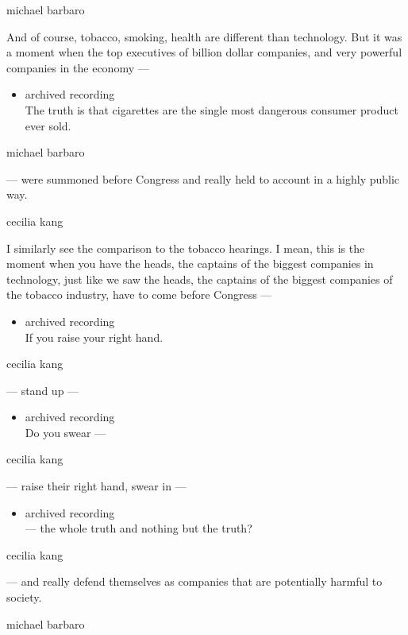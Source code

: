michael barbaro

And of course, tobacco, smoking, health are different than technology.
But it was a moment when the top executives of billion dollar companies,
and very powerful companies in the economy ---

\begin{itemize}
\tightlist
\item
  archived recording\\
  The truth is that cigarettes are the single most dangerous consumer
  product ever sold.
\end{itemize}

michael barbaro

--- were summoned before Congress and really held to account in a highly
public way.

cecilia kang

I similarly see the comparison to the tobacco hearings. I mean, this is
the moment when you have the heads, the captains of the biggest
companies in technology, just like we saw the heads, the captains of the
biggest companies of the tobacco industry, have to come before Congress
---

\begin{itemize}
\tightlist
\item
  archived recording\\
  If you raise your right hand.
\end{itemize}

cecilia kang

--- stand up ---

\begin{itemize}
\tightlist
\item
  archived recording\\
  Do you swear ---
\end{itemize}

cecilia kang

--- raise their right hand, swear in ---

\begin{itemize}
\tightlist
\item
  archived recording\\
  --- the whole truth and nothing but the truth?
\end{itemize}

cecilia kang

--- and really defend themselves as companies that are potentially
harmful to society.

michael barbaro

